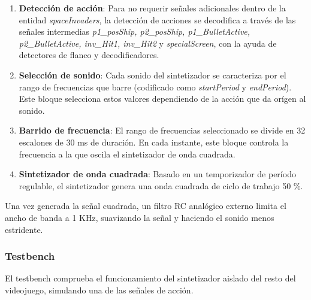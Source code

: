 \begin{enumerate}

\item \textbf{Detección de acción}: Para no requerir señales adicionales dentro de la entidad \emph{spaceInvaders}, la detección de acciones se decodifica a través de las señales intermedias \emph{p1\_posShip, p2\_posShip, p1\_BulletActive, p2\_BulletActive, inv\_Hit1, inv\_Hit2} y \emph{specialScreen}, con la ayuda de detectores de flanco y decodificadores.

\item \textbf{Selección de sonido}: Cada sonido del sintetizador se caracteriza por el rango de frecuencias que barre (codificado como \emph{startPeriod} y \emph{endPeriod}). Este bloque selecciona estos valores dependiendo de la acción que da orígen al sonido.

\item \textbf{Barrido de frecuencia}: El rango de frecuencias seleccionado se divide en 32 escalones de 30 ms de duración. En cada instante, este bloque controla la frecuencia a la que oscila el sintetizador de onda cuadrada. 

\item \textbf{Sintetizador de onda cuadrada}: Basado en un temporizador de período regulable, el sintetizador genera una onda cuadrada de ciclo de trabajo 50 \%.

\end{enumerate}

Una vez generada la señal cuadrada, un filtro RC analógico externo limita el ancho de banda a 1 KHz, suavizando la señal y haciendo el sonido menos estridente.

\subsubsection{Testbench}
El testbench comprueba el funcionamiento del sintetizador aislado del resto del videojuego, simulando una de las señales de acción.